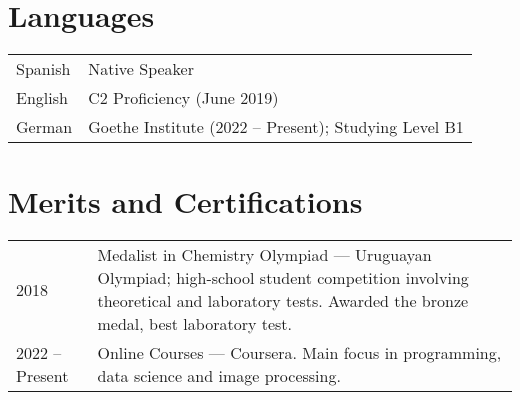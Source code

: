 \documentclass[a4paper,12pt]{article}
\begin{document}
\section{Languages}
\begin{tabularx}{\linewidth}{@{}l X@{}} 
Spanish & Native Speaker \\
English & C2 Proficiency (June 2019) \\
German & Goethe Institute (2022 -- Present); Studying Level B1 \\
\end{tabularx}

\section{Merits and Certifications}
\begin{tabularx}{\linewidth}{@{}l X@{}} 
2018 & Medalist in Chemistry Olympiad — Uruguayan Olympiad; high-school student competition involving theoretical and laboratory tests. Awarded the bronze medal, best laboratory test. \\
2022 -- Present & Online Courses — Coursera. Main focus in programming, data science and image processing. \\
\end{tabularx}

\vfill
{}
\end{document}
